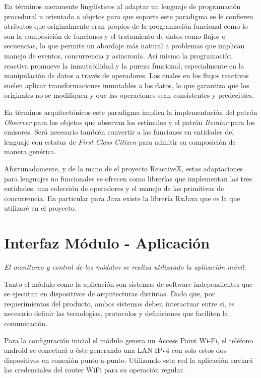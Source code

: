 En términos meramente lingüísticos al adaptar un lenguaje de programación procedural u orientado a objetos para que soporte este paradigma se le confieren atributos que originalmente eran propios de la programación funcional como lo son la composición de funciones y el tratamiento de datos como flujos o secuencias, lo que permite un abordaje más natural a problemas que implican manejo de eventos, concurrencia y asincronía.
Así mismo la programación reactiva promueve la inmutabilidad y la pureza funcional, especialmente en la manipulación de datos a través de operadores. Los cuales en los flujos reactivos suelen aplicar transformaciones inmutables a los datos, lo que garantiza que los originales no se modifiquen y que las operaciones sean consistentes y predecibles.

En términos arquitectónicos este paradigma implica la implementación del patrón \emph{Observer} para los objetos que observan los estímulos y el patrón \emph{Iterator} para los emisores. Será necesario también convertir a las funciones en entidades del lenguaje con estatus de  \emph{First Class Citizen} para admitir su composición de manera genérica.

Afortunadamente, y de la mano de el proyecto ReactiveX, estas adaptaciones para lenguajes no funcionales se ofrecen como librerías que implementan las tres entidades, una colección de operadores y el manejo de las primitivas de concurrencia. En particular para Java existe la librería RxJava que es la que utilizaré en el proyecto.



\section{Interfaz Módulo - Aplicación}
\label{section:interfaces}
\emph{El monitoreo y control de los módulos se realiza utilizando la aplicación móvil.}

Tanto el módulo como la aplicación son sistemas de software independientes que se ejecutan en dispositivos de arquitecturas distintas. Dado que, por requerimientos del producto, ambos sistemas deben interactuar entre si, es necesario definir las tecnologías, protocolos y definiciones que faciliten la comunicación.

Para la configuración inicial el módulo genera un Access Point Wi-Fi, el teléfono android se conectará a éste generando una LAN IPv4 con solo estos dos dispositivos en conexión punto-a-punto. Utilizando esta red la aplicación enviará las credenciales del router WiFi para su operación regular.

